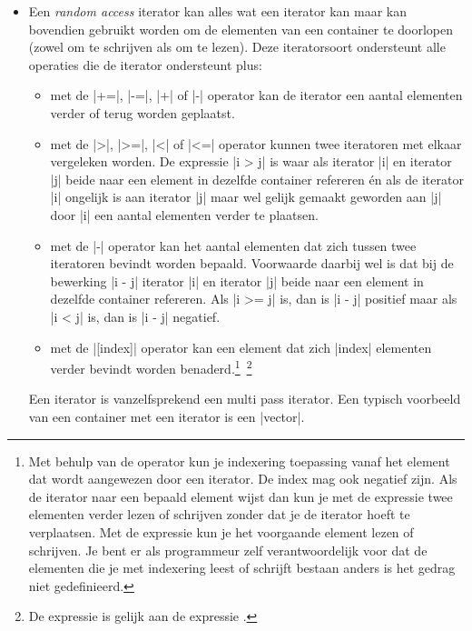 \begin{cpplstShortInline}
\begin{itemize}
	Deze iteratorsoort ondersteunt alle operaties die de  ondersteunt plus:
	\begin{itemize}
		\item met de |--| operator kan de iterator op het \emph{vorige} element worden geplaatst.
	\end{itemize}
	Een  iterator is vanzelfsprekend een multi pass iterator.
	Een typisch voorbeeld van een container met een  iterator is een |list|.
	\item Een \emph{random access} iterator kan alles wat een  iterator kan maar kan bovendien gebruikt worden om de elementen van een container  te doorlopen (zowel om te schrijven als om te lezen).
	Deze iteratorsoort ondersteunt alle operaties die de  iterator ondersteunt plus:
	\begin{itemize}
		\item met de |+=|, |-=|, |+| of |-| operator kan de iterator een aantal elementen verder of terug worden geplaatst.
		\item met de |>|, |>=|, |<| of |<=| operator kunnen twee iteratoren met elkaar vergeleken worden.
		De expressie |i > j| is waar als iterator |i| en iterator |j| beide naar een element in dezelfde container refereren én als de iterator |i| ongelijk is aan iterator |j| maar wel gelijk gemaakt geworden aan |j| door |i| een aantal elementen verder te plaatsen.
		\item met de |-| operator kan het aantal elementen dat zich tussen twee iteratoren bevindt worden bepaald.
		Voorwaarde daarbij wel is dat bij de bewerking |i - j| iterator |i| en iterator |j| beide naar een element in dezelfde container refereren.
		Als |i >= j| is, dan is |i - j| positief maar als |i < j| is, dan is |i - j| negatief.
		\item met de |[index]| operator kan een element dat zich |index| elementen verder bevindt worden benaderd.\footnote{%
			Met behulp van de operator \code{[]} kun je indexering toepassing vanaf het element dat wordt aangewezen door een iterator.
			De index mag ook negatief zijn.
			Als de iterator  naar een bepaald element wijst dan kun je met de expressie  twee elementen verder lezen of schrijven zonder dat je de iterator  hoeft te verplaatsen.
			Met de expressie  kun je het voorgaande element lezen of schrijven.
			Je bent er als programmeur zelf verantwoordelijk voor dat de elementen die je met indexering leest of schrijft bestaan anders is het gedrag niet gedefinieerd.
		}~\footnote{ %
			De expressie  is gelijk aan de expressie .
		}
	\end{itemize}
	Een  iterator is vanzelfsprekend een multi pass iterator.
	Een typisch voorbeeld van een container met een  iterator is een |vector|.
\end{itemize}


\end{cpplstShortInline}
